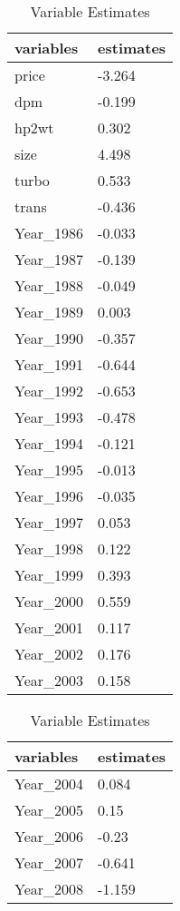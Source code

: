 \begin{table}[!htbp]
  \caption{Variable Estimates}
  \label{tab1}
  \small \centering
\begin{tabular}{@{}ll@{}}
\toprule
variables       & estimates \\ \midrule
price           & -3.264    \\
dpm             & -0.199    \\
hp2wt           & 0.302     \\
size            & 4.498     \\
turbo           & 0.533     \\
trans           & -0.436    \\
Year\_1986      & -0.033    \\
Year\_1987      & -0.139    \\
Year\_1988      & -0.049    \\
Year\_1989      & 0.003     \\
Year\_1990      & -0.357    \\
Year\_1991      & -0.644    \\
Year\_1992      & -0.653    \\
Year\_1993      & -0.478    \\
Year\_1994      & -0.121    \\
Year\_1995      & -0.013    \\
Year\_1996      & -0.035    \\
Year\_1997      & 0.053     \\
Year\_1998      & 0.122     \\
Year\_1999      & 0.393     \\
Year\_2000      & 0.559     \\
Year\_2001      & 0.117     \\
Year\_2002      & 0.176     \\
Year\_2003      & 0.158     \\
\bottomrule
\end{tabular}
\begin{tabular}{@{}ll@{}}
\toprule
variables       & estimates \\ \midrule
Year\_2004      & 0.084     \\
Year\_2005      & 0.15      \\
Year\_2006      & -0.23     \\
Year\_2007      & -0.641    \\
Year\_2008      & -1.159    \\

\end{tabular}
\end{table}
